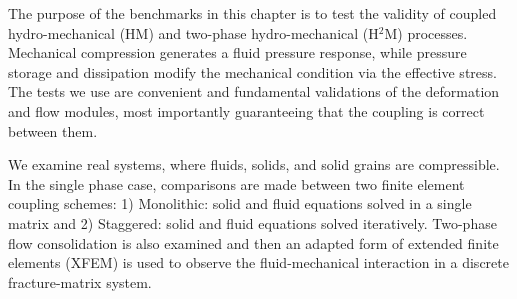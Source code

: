 
The purpose of the benchmarks in this chapter is to test the validity of coupled hydro-mechanical (HM) and two-phase hydro-mechanical (H$^2$M) processes. Mechanical compression generates a fluid pressure response, while pressure storage and dissipation modify the mechanical condition via the effective stress. The tests we use are convenient and fundamental validations of the deformation and flow modules, most importantly guaranteeing that the coupling is correct between them. 

We examine real systems, where fluids, solids, and solid grains are compressible. In the single phase case, comparisons are made between two finite element coupling schemes: 1) Monolithic: solid and fluid equations solved in a single matrix and 2) Staggered: solid and fluid equations solved iteratively. Two-phase flow consolidation is also examined and then an adapted form of extended finite elements (XFEM) is used to observe the fluid-mechanical interaction in a discrete fracture-matrix system. 









